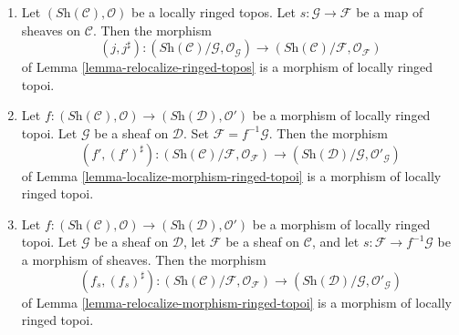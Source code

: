 \begin{lemma}
\begin{enumerate}
\item  Let $(\textit{Sh}(\mathcal{C}), \mathcal{O})$ be a locally
ringed topos. Let $s : \mathcal{G} \to \mathcal{F}$ be a map of sheaves
on $\mathcal{C}$. Then the morphism
$$
(j, j^\sharp) :
(\textit{Sh}(\mathcal{C})/\mathcal{G}, \mathcal{O}_{\mathcal{G}})
\longrightarrow
(\textit{Sh}(\mathcal{C})/\mathcal{F}, \mathcal{O}_{\mathcal{F}})
$$
of
Lemma \ref{lemma-relocalize-ringed-topos}
is a morphism of locally ringed topoi.
\item Let
$f :
(\textit{Sh}(\mathcal{C}), \mathcal{O})
\longrightarrow
(\textit{Sh}(\mathcal{D}), \mathcal{O}')$
be a morphism of locally ringed topoi. Let $\mathcal{G}$ be a sheaf
on $\mathcal{D}$. Set $\mathcal{F} = f^{-1}\mathcal{G}$.
Then the morphism
$$
(f', (f')^\sharp) :
(\textit{Sh}(\mathcal{C})/\mathcal{F}, \mathcal{O}_{\mathcal{F}})
\longrightarrow
(\textit{Sh}(\mathcal{D})/\mathcal{G}, \mathcal{O}'_{\mathcal{G}})
$$
of
Lemma \ref{lemma-localize-morphism-ringed-topoi}
is a morphism of locally ringed topoi.
\item  Let
$f :
(\textit{Sh}(\mathcal{C}), \mathcal{O})
\longrightarrow
(\textit{Sh}(\mathcal{D}), \mathcal{O}')$
be a morphism of locally ringed topoi. Let $\mathcal{G}$ be a sheaf
on $\mathcal{D}$, let $\mathcal{F}$ be a sheaf on $\mathcal{C}$, and
let $s : \mathcal{F} \to f^{-1}\mathcal{G}$ be a morphism of sheaves.
Then the morphism
$$
(f_s, (f_s)^\sharp) :
(\textit{Sh}(\mathcal{C})/\mathcal{F}, \mathcal{O}_{\mathcal{F}})
\longrightarrow
(\textit{Sh}(\mathcal{D})/\mathcal{G}, \mathcal{O}'_{\mathcal{G}})
$$
of
Lemma \ref{lemma-relocalize-morphism-ringed-topoi}
is a morphism of locally ringed topoi.
\end{enumerate}
\end{lemma}

